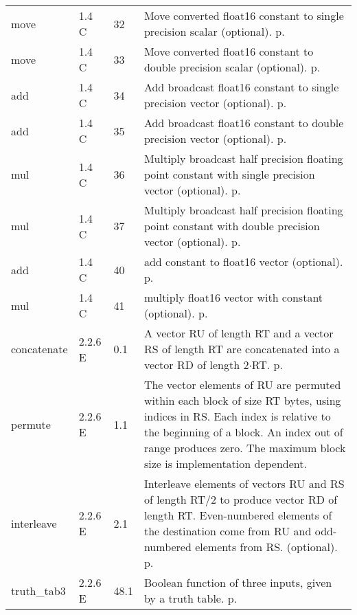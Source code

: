 \documentclass[forwardcom.tex]{subfiles}
\begin{document}
\begin{longtable} {|p{25mm}|p{14mm}|p{10mm}|p{95mm}|}
move          & 1.4 C & 32 & Move converted float16 constant to single
precision scalar (optional). p. \pageref{table:moveInstruction} \\
move          & 1.4 C & 33 & Move converted float16 constant to double
precision scalar (optional). p. \pageref{table:moveInstruction} \\
add           & 1.4 C & 34 & Add broadcast float16 constant to single
precision vector (optional). p. \pageref{table:addInstruction} \\
add           & 1.4 C & 35 & Add broadcast float16 constant to double
precision vector (optional). p. \pageref{table:addInstruction} \\
mul           & 1.4 C & 36 & Multiply broadcast half precision floating point constant with single precision vector (optional). p. \pageref{table:mulInstruction} \\
mul           & 1.4 C & 37 & Multiply broadcast half precision floating point constant with double precision vector (optional). p. \pageref{table:mulInstruction} \\
add           & 1.4 C & 40 & add constant to float16 vector (optional). p. \pageref{table:addInstruction} \\
mul           & 1.4 C & 41 & multiply float16 vector with constant (optional). p. \pageref{table:mulInstruction} \\
concatenate   & 2.2.6 E & 0.1 & A vector RU of length RT and a vector RS of length RT are concatenated into a vector RD of length 2$\cdot$RT. p. \pageref{table:concatenateInstruction} \\
permute       & 2.2.6 E & 1.1 & The vector elements of RU are permuted within each block of size RT bytes, using indices in RS. Each index is relative to the
beginning of a block. An index out of range produces zero. The
maximum block size is implementation dependent. \\
interleave    & 2.2.6 E & 2.1 & Interleave elements of vectors RU and RS of length RT/2 to produce vector RD of length RT. Even-numbered elements of the destination come from RU and odd-numbered elements from RS. (optional). p. \pageref{table:permuteInstruction} \\
truth\_tab3   & 2.2.6 E & 48.1 & Boolean function of three inputs, given by a truth table. p. \pageref{table:truthTab3Instruction} \\


\end{longtable}
\end{document}
